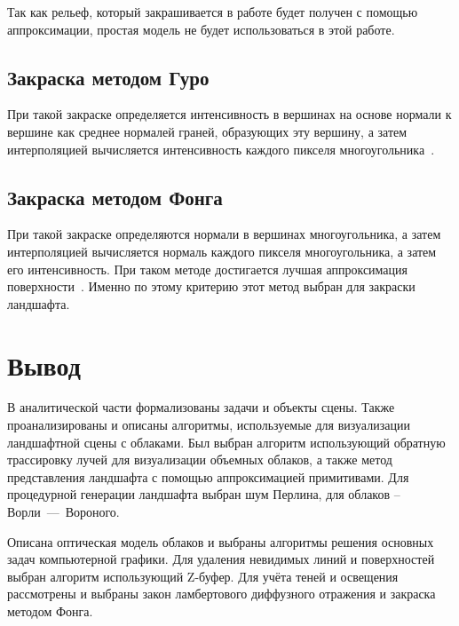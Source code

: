 Так как рельеф, который закрашивается в работе будет получен с помощью аппроксимации, простая модель не будет использоваться в этой работе.

\subsection{Закраска методом Гуро}
При такой закраске определяется интенсивность в вершинах на основе нормали к вершине как среднее нормалей граней, образующих эту вершину, а затем интерполяцией вычисляется интенсивность каждого пикселя многоугольника~\cite{rodgers1989algorithms}.

\subsection{Закраска методом Фонга}
При такой закраске определяются нормали в вершинах многоугольника, а затем интерполяцией вычисляется нормаль каждого пикселя многоугольника, а затем его интенсивность.
При таком методе достигается лучшая аппроксимация поверхности~\cite{rodgers1989algorithms}. Именно по этому критерию этот метод выбран для закраски ландшафта.

\section*{Вывод}
В аналитической части формализованы задачи и объекты сцены. Также проанализированы и описаны алгоритмы, используемые для визуализации ландшафтной сцены с облаками. 	
Был выбран алгоритм использующий обратную трассировку лучей для визуализации объемных облаков, а также метод представления ландшафта с помощью аппроксимацией примитивами. Для процедурной генерации ландшафта выбран шум Перлина, для облаков -- Ворли~---~Вороного.

Описана оптическая модель облаков и выбраны алгоритмы решения основных задач компьютерной графики. Для удаления невидимых линий и поверхностей выбран алгоритм использующий Z-буфер. Для учёта теней и освещения рассмотрены и выбраны закон ламбертового диффузного отражения и закраска методом Фонга.
